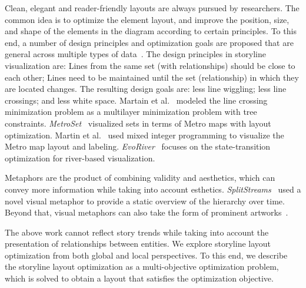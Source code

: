 \documentclass[review,journal]{vgtc}         %
\begin{document}
Clean, elegant and reader-friendly layouts are always pursued by researchers. The common idea is to optimize the element layout, and improve the position, size, and shape of the elements in the diagram according to certain principles. To this end, a number of design principles and optimization goals are proposed that are general across multiple types of data~\cite{tanahashi_design_2012, liu_storyflow_2013, tanahashi_efficient_2015}. The design principles in storyline visualization are: Lines from the same set (with relationships) should be close to each other; Lines need to be maintained until the set (relationship) in which they are located changes. The resulting design goals are: less line wiggling; less line crossings; and less white space. Martain et al.~\cite{gronemann_crossing_2016} modeled the line crossing minimization problem as a multilayer minimization problem with tree constraints. \textit{MetroSet}~\cite{jacobsen_metrosets_2020} visualized sets in terms of Metro maps with layout optimization. Martin et al.~\cite{nollenburg_drawing_2010} used mixed integer programming to visualize the Metro map layout and labeling. \textit{EvoRiver}~\cite{sun_evoriver_2014} focuses on the state-transition optimization for river-based visualization.

Metaphors are the product of combining validity and aesthetics, which can convey more information while taking into account esthetics.  \textit{SplitStreams}~\cite{bolte_splitstreams_2020} used a novel visual metaphor to provide a static overview of the hierarchy over time. Beyond that, visual metaphors can also take the form of prominent artworks~\cite{zhang_visual_2022}.

The above work cannot reflect story trends while taking into account the presentation of relationships between entities. We explore storyline layout optimization from both global and local perspectives. To this end, we describe the storyline layout optimization as a multi-objective optimization problem, which is solved to obtain a layout that satisfies the optimization objective.
\end{document}
